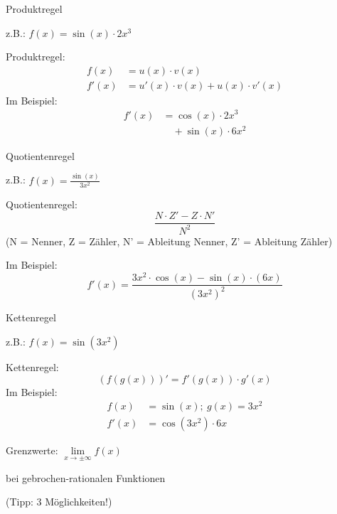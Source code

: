 \documentclass[paper=a6,ngerman,twoside=true,fontsize=14pt, parskip = half]{scrartcl}
\begin{document}
\begin{frage}
	Produktregel
	
	z.B.: $f(x)=\sin(x)\cdot2x^3$
	
\end{frage}
\begin{antwort}
	Produktregel:
	\begin{align*}
	f(x) &= u(x)\cdot v(x) \\
	f'(x)&=u'(x)\cdot v(x)+u(x)\cdot v'(x)
	\end{align*}
	Im Beispiel:
	\begin{align*}
	f'(x)&=\cos(x)\cdot 2x^3 \\
	&\quad+ \sin(x)\cdot 6x^2
	\end{align*}
\end{antwort}
\begin{frage}
	Quotientenregel
	
	z.B.: $f(x)=\frac{\sin(x)}{3x^2}$
	
\end{frage}
\begin{antwort}
	Quotientenregel:
	\[
	\frac{N \cdot Z' - Z \cdot N'}{N^2}
	\]
	\footnotesize (N = Nenner, Z = Zähler, N' = Ableitung Nenner, Z' = Ableitung Zähler)
	
	\normalsize
	Im Beispiel:
	\[
	f'(x)=\frac{3x^2 \cdot \cos(x) - \sin(x) \cdot (6x)}{(3x^2)^2}
	\]
\end{antwort}
\begin{frage}
	Kettenregel
	
	z.B.: $f(x)={\sin(3x^2)}$
	
\end{frage}
\begin{antwort}
	Kettenregel:
	\[
	(f(g(x)))'=f'(g(x))\cdot g'(x)
	\]
	Im Beispiel:
	\begin{align*}
	f(x)&=\sin(x);~ g(x)=3x^2 \\
	f'(x)&=\cos(3x^2)\cdot 6x
	\end{align*}
\end{antwort}
\begin{frage}
	Grenzwerte: $\lim\limits_{x \rightarrow \pm\infty}{f(x)}$
	\bigskip
	
	bei gebrochen-rationalen Funktionen
	
	(Tipp: 3 Möglichkeiten!)
	
\end{frage}
\end{document}
